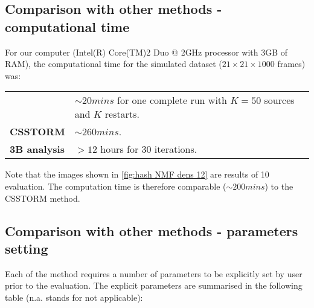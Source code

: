 
\subsection{Comparison with other methods - computational time}

For our computer (Intel(R) Core(TM)2 Duo @ 2GHz processor with 3GB of RAM), the computational time for the simulated dataset ($21\times21\times1000$ frames) was:

\begin{tabular}{ll}
	{\bf\inmf} & $\sim 20 \unit{mins}$ for one complete run with $K=50$ sources and $K$ restarts.\\
	
	{\bf CSSTORM} & $\sim 260 \unit{mins}$.\\
	
	{\bf 3B analysis} & $>12$ hours for $30$ iterations.\\
\end{tabular}

Note that the \inmf{} images shown in \autoref{fig:hash NMF dens 12} are results of 10 \inmf{} evaluation. The computation time is therefore comparable ($\sim 200 \unit{mins}$) to the CSSTORM method. 

%
%	
%	

\subsection{Comparison with other methods - parameters setting}

Each of the method requires a number of parameters to be explicitly set by user prior to the evaluation. The explicit parameters are summarised in the following table (n.a. stands for not applicable):

